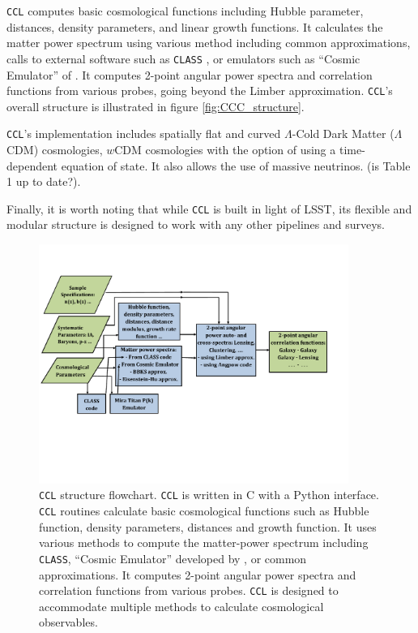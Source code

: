 \documentclass[\docopts]{\docclass}
\newcommand{\ccl}{{\tt CCL}\xspace}
\begin{document}
\ccl computes basic cosmological functions including Hubble parameter, distances, density parameters, and linear growth functions. It calculates the matter power spectrum using various method including common approximations, calls to external software such as {\tt CLASS} \citep{class}, or emulators such as ``Cosmic Emulator'' of \citet{Lawrence17}. It computes 2-point angular power spectra and correlation functions from various probes, going beyond the Limber approximation. \ccl 's overall structure is illustrated in figure \ref{fig:CCC_structure}. 

\ccl 's implementation includes spatially flat and curved $\Lambda$-Cold Dark Matter ($\Lambda$CDM) cosmologies, $w$CDM cosmologies with the option of using a time-dependent equation of state. It also allows the use of massive neutrinos. (is Table 1 up to date?). 

Finally, it is worth noting that while \ccl is built in light of LSST, its flexible and modular structure is designed to work with any other pipelines and surveys.  

\begin{figure}
\centering
\includegraphics[width=0.9\textwidth]{CCL_Flowchart3}
\caption{\ccl structure flowchart. \ccl is written in C with a Python interface. \ccl routines calculate basic cosmological functions such as Hubble function, density parameters, distances and growth function. It uses various methods to compute the matter-power spectrum including {\tt CLASS}, ``Cosmic Emulator'' developed by \citet{Lawrence17}, or common approximations. It computes 2-point angular power spectra and correlation functions from various probes. \ccl is designed to accommodate multiple methods to calculate cosmological observables.}
\label{fig:CCL_structure}
\end{figure}
\end{document}
